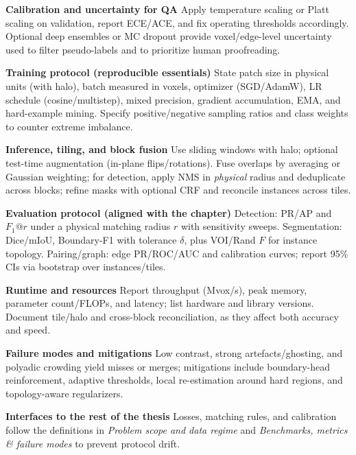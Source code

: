 \medskip
\noindent\textbf{Calibration and uncertainty for QA}\;
Apply temperature scaling or Platt scaling on validation, report ECE/ACE, and fix operating thresholds accordingly. Optional deep ensembles or MC dropout provide voxel/edge-level uncertainty used to filter pseudo-labels and to prioritize human proofreading.\par

\medskip
\noindent\textbf{Training protocol (reproducible essentials)}\;
State patch size in physical units (with halo), batch measured in voxels, optimizer (SGD/AdamW), LR schedule (cosine/multistep), mixed precision, gradient accumulation, EMA, and hard-example mining.
Specify positive/negative sampling ratios and class weights to counter extreme imbalance.\par

\medskip
\noindent\textbf{Inference, tiling, and block fusion}\;
Use sliding windows with halo; optional test-time augmentation (in-plane flips/rotations).
Fuse overlaps by averaging or Gaussian weighting; for detection, apply NMS in \emph{physical} radius and deduplicate across blocks; refine masks with optional CRF and reconcile instances across tiles.\par

\medskip
\noindent\textbf{Evaluation protocol (aligned with the chapter)}\;
Detection: PR/AP and \(F_1@r\) under a physical matching radius \(r\) with sensitivity sweeps.
Segmentation: Dice/mIoU, Boundary-F1 with tolerance \(\delta\), plus VOI/Rand \(F\) for instance topology.
Pairing/graph: edge PR/ROC/AUC and calibration curves; report 95\% CIs via bootstrap over instances/tiles.\par

\medskip
\noindent\textbf{Runtime and resources}\;
Report throughput (Mvox/s), peak memory, parameter count/FLOPs, and latency; list hardware and library versions.
Document tile/halo and cross-block reconciliation, as they affect both accuracy and speed.\par

\medskip
\noindent\textbf{Failure modes and mitigations}\;
Low contrast, strong artefacts/ghosting, and polyadic crowding yield misses or merges; mitigations include boundary-head reinforcement, adaptive thresholds, local re-estimation around hard regions, and topology-aware regularizers.\par

\medskip
\noindent\textbf{Interfaces to the rest of the thesis}\;
Losses, matching rules, and calibration follow the definitions in \emph{Problem scope and data regime} and \emph{Benchmarks, metrics \& failure modes} to prevent protocol drift.\par

